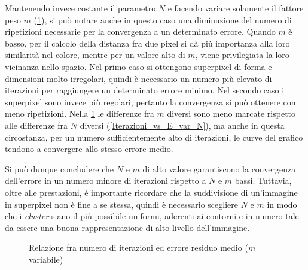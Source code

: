 \documentclass[12pt,a4paper,oneside]{article}
\begin{document}
Mantenendo invece costante il parametro $N$ e facendo variare solamente il fattore peso $m$ (\cref{Iterazioni_vs_E_var_m}), si può notare anche in questo caso una diminuzione del numero di ripetizioni necessarie per la convergenza a un determinato errore. Quando $m$ è basso, per il calcolo della distanza fra due pixel si dà più importanza alla loro similarità nel colore, mentre per un valore alto di $m$, viene privilegiata la loro vicinanza nello spazio. Nel primo caso si ottengono superpixel di forma e dimensioni molto irregolari, quindi è necessario un numero più elevato di iterazioni per raggiungere un determinato errore minimo. Nel secondo caso i superpixel sono invece più regolari, pertanto la convergenza si può ottenere con meno ripetizioni. Nella \cref{Iterazioni_vs_E_var_m} le differenze fra $m$ diversi sono meno marcate rispetto alle differenze fra $N$ diversi (\cref{Iterazioni_vs_E_var_N}), ma anche in questa circostanza, per un numero sufficientemente alto di iterazioni, le curve del grafico tendono a convergere allo stesso errore medio.

Si può dunque concludere che $N$ e $m$ di alto valore garantiscono la convergenza dell'errore in un numero minore di iterazioni rispetto a $N$ e $m$ bassi. Tuttavia, oltre alle prestazioni, è importante ricordare che la suddivisione di un'immagine in superpixel non è fine a se stessa, quindi è necessario scegliere $N$ e $m$ in modo che i \textit{cluster} siano il più possibile uniformi, aderenti ai contorni e in numero tale da essere una buona rappresentazione di alto livello dell'immagine.

\begin{figure}[p]
\centering
{}
\captionsetup{justification=centering}
\caption{Relazione fra numero di iterazioni ed errore residuo medio ($m$ variabile)}\label{Iterazioni_vs_E_var_m}
\vspace*{5ex}
\end{figure}
\end{document}
